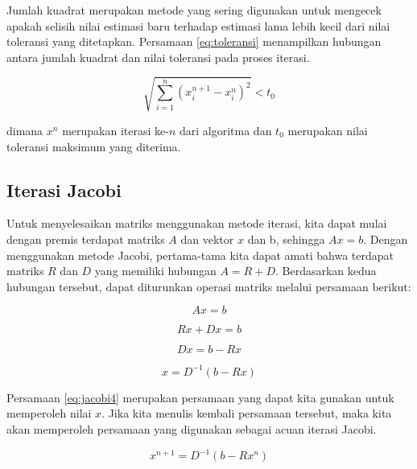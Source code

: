 \documentclass[]{book}
\theoremstyle{definition}
\theoremstyle{definition}
\theoremstyle{definition}
\theoremstyle{remark}
\begin{document}
Jumlah kuadrat merupakan metode yang sering digunakan untuk mengecek apakah selisih nilai estimasi baru terhadap estimasi lama lebih kecil dari nilai toleransi yang ditetapkan. Persamaan \eqref{eq:toleransi} menampilkan hubungan antara jumlah kuadrat dan nilai toleransi pada proses iterasi.

\begin{equation}
\sqrt{\sum_{i=1}^n\left(x_i^{n+1}-x_i^{n}\right)^2}<t_0
 \label{eq:toleransi}
\end{equation}

dimana \(x^{n}\) merupakan iterasi ke-\(n\) dari algoritma dan \(t_0\) merupakan nilai toleransi maksimum yang diterima.

\hypertarget{jacobiiter}{%
\subsection{Iterasi Jacobi}\label{jacobiiter}}

Untuk menyelesaikan matriks menggunakan metode iterasi, kita dapat mulai dengan premis terdapat matriks \(A\) dan vektor \(x\) dan b, sehingga \(Ax = b\). Dengan menggunakan metode Jacobi, pertama-tama kita dapat amati bahwa terdapat matriks \(R\) dan \(D\) yang memiliki hubungan \(A = R + D\). Berdasarkan kedua hubungan tersebut, dapat diturunkan operasi matriks melalui persamaan berikut:

\begin{equation}
Ax=b
 \label{eq:jacobi}
\end{equation}

\begin{equation}
Rx+Dx=b
 \label{eq:jacobi2}
\end{equation}

\begin{equation}
Dx=b-Rx
 \label{eq:jacobi3}
\end{equation}

\begin{equation}
x=D^{-1}\left(b-Rx\right)
 \label{eq:jacobi4}
\end{equation}

Persamaan \eqref{eq:jacobi4} merupakan persamaan yang dapat kita gunakan untuk memperoleh nilai \(x\). Jika kita menulis kembali persamaan tersebut, maka kita akan memperoleh persamaan yang digunakan sebagai acuan iterasi Jacobi.

\begin{equation}
x^{n+1}=D^{-1}\left(b-Rx^{n}\right)
 \label{eq:jacobi5}
\end{equation}
\end{document}
